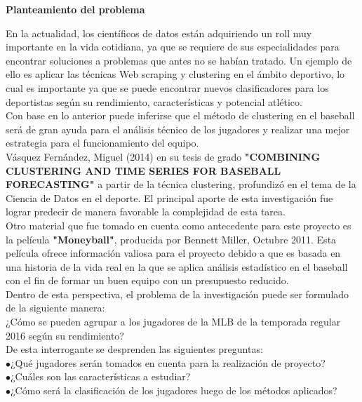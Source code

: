 \documentclass[11pt,letterpaper]{report}
\begin{document}
	\begin{center}
		\textbf{\large Planteamiento del problema}
	\end{center}
	
	 En la actualidad, los cient\'ificos de datos est\'an adquiriendo un roll muy importante en la vida cotidiana, ya que se requiere de sus especialidades para encontrar soluciones a problemas que antes no se hab\'ian tratado. Un ejemplo de ello es aplicar las t\'ecnicas Web scraping y clustering en el \'ambito deportivo, lo cual es importante ya que se puede encontrar nuevos clasificadores para los deportistas seg\'un su rendimiento, caracter\'isticas y potencial atl\'etico.\\
	 
	 Con base en lo anterior puede inferirse que el m\'etodo de clustering en el baseball ser\'a de gran ayuda para el an\'alisis t\'ecnico de los jugadores y realizar una mejor estrategia para el funcionamiento del equipo.\\ 
	  
	 
	 V\'asquez Fern\'andez, Miguel (2014) en su tesis de grado \textbf{"COMBINING CLUSTERING AND TIME SERIES FOR BASEBALL FORECASTING"} a partir de la t\'ecnica clustering, profundiz\'o en el tema de la Ciencia de Datos en el deporte. El principal aporte de esta investigaci\'on fue lograr predecir de manera favorable la complejidad de esta tarea. \\ 
	 
	 Otro material que fue tomado en cuenta como antecedente para este proyecto es la pel\'icula \textbf{"Moneyball"}, producida por Bennett Miller, Octubre 2011. Esta pel\'icula ofrece informaci\'on valiosa para el proyecto debido a que es basada en una historia de la vida real en la que se aplica an\'alisis estad\'istico en el baseball con el fin de formar un buen equipo con un presupuesto reducido.\\ 
	 
	 Dentro de esta perspectiva, el problema de la investigaci\'on puede ser formulado de la siguiente manera:\\
	  
	 ¿C\'omo se pueden agrupar a los jugadores de la MLB de la temporada regular 2016 seg\'un su rendimiento? \\ 
	 
	 De esta interrogante se desprenden las siguientes preguntas:\\
	  
	\noindent $\bullet$¿Qu\'e jugadores ser\'an tomados en cuenta para la realizaci\'on de proyecto? \\
	$\bullet$¿Cu\'ales son las caracter\'isticas a estudiar? \\ 
    $\bullet$¿C\'omo ser\'a la clasificaci\'on de los jugadores luego de los m\'etodos aplicados? \\ 
    
\end{document}
